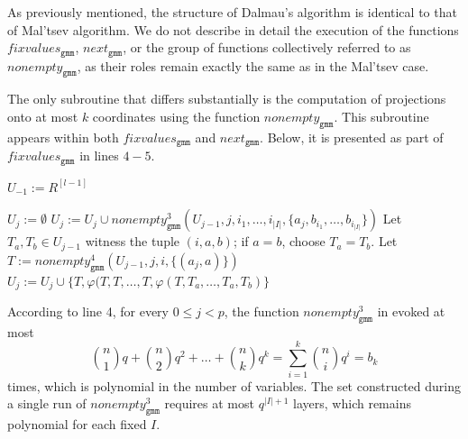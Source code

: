 \documentclass{article}
\theoremstyle{definition}
\theoremstyle{theorem}
\theoremstyle{theorem}
\theoremstyle{remark}
\theoremstyle{remark}
\theoremstyle{example}
\theoremstyle{notation}
\theoremstyle{theorem}
\begin{document}
As previously mentioned, the structure of Dalmau's algorithm is identical to that of Mal'tsev algorithm. We do not describe in detail the execution of the functions $fixvalues_{\texttt{gmm}}$, $next_{\texttt{gmm}}$, or the group of functions collectively referred to as $nonempty_{\texttt{gmm}}$, as their roles remain exactly the same as in the Mal'tsev case.

The only subroutine that differs substantially is the computation of projections onto at most $k$ coordinates using the function $nonempty_{\texttt{gmm}}$. This subroutine appears within both $fixvalues_{\texttt{gmm}}$ and $next_{\texttt{gmm}}$. Below, it is presented as part of $fixvalues_{\texttt{gmm}}$ in lines $4-5$.
\begin{algorithm}[H]\label{asjd643}
\caption{$fixvalues_{\texttt{gmm}}(R^{[l-1]}, a_0, \ldots, a_{p-1})$}\label{aaasp}
\begin{algorithmic}[1] 
\State $U_{-1} := R^{[l-1]}$ 

   \State $U_j := \emptyset$ 
   \State $U_j :=U_j\cup nonempty_{\texttt{gmm}}^3(U_{j-1},j,i_1,\ldots,i_{|I|},\{a_j,b_{i_1},\ldots,b_{i_{|I|}}\})$
   \EndFor
        \State Let $T_a, T_b \in U_{j-1}$ witness the tuple $(i, a, b)$; if $a = b$, choose $T_a = T_b$.
\State Let $T := nonempty_{\texttt{gmm}}^4(U_{j-1}, j, i, \{(a_j, a)\})$ 
           \State $U_j := U_j \cup \{T, \varphi(T, T,\ldots,T,\varphi(T, T_a,\ldots,T_a, T_b)\}$ 
        \EndIf
     \EndFor
\EndFor
\\
\end{algorithmic}
\end{algorithm}
According to line 4, for every $0 \leq j < p$, the function $nonempty_{\texttt{gmm}}^3$ in evoked at most
\[
\binom{n}{1}q + \binom{n}{2}q^2 + \ldots + \binom{n}{k}q^k = \sum_{i=1}^{k} \binom{n}{i} q^i = b_k
\]
times, which is polynomial in the number of variables. The set constructed during a single run of $nonempty_{\texttt{gmm}}^3$ requires at most $q^{|I|+1}$ layers, which remains polynomial for each fixed $I$. 
\end{document}
